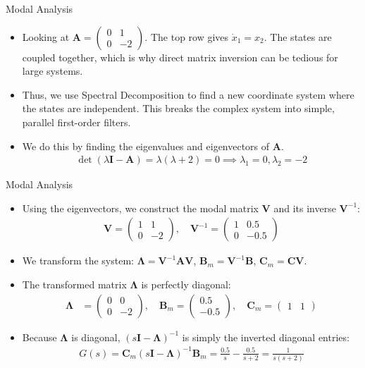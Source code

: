 \documentclass{beamer}
\theoremstyle{remark}
\newcommand{\myvec}[1]{\ensuremath{\begin{pmatrix}#1\end{pmatrix}}}
\let\vec\mathbf
\numberwithin{equation}{section}
\begin{document}
\begin{frame}{Modal Analysis}
    \begin{itemize}
        \item Looking at $\vec{A} = \myvec{0 & 1 \\ 0 & -2}$. The top row gives $\dot{x}_1 = x_2$. The states are coupled together, which is why direct matrix inversion can be tedious for large systems.
        \item Thus, we use Spectral Decomposition to find a new coordinate system where the states are independent. This breaks the complex system into simple, parallel first-order filters.
        \item We do this by finding the eigenvalues and eigenvectors of $\vec{A}$.
        \begin{align}
            \det(\lambda\vec{I} - \vec{A}) = \lambda(\lambda + 2) = 0 \implies \lambda_1 = 0, \lambda_2 = -2
        \end{align}
    \end{itemize}
\end{frame}

\begin{frame}{Modal Analysis}
    \begin{itemize}
        \item Using the eigenvectors, we construct the modal matrix $\vec{V}$ and its inverse $\vec{V}^{-1}$:
        \begin{align}
            \vec{V} = \myvec{ 1 & 1 \\ 0 & -2 }, \quad \vec{V}^{-1} = \myvec{ 1 & 0.5 \\ 0 & -0.5 }
        \end{align}
        \item We transform the system: $\vec{\Lambda} = \vec{V}^{-1}\vec{A}\vec{V}$, $\vec{B}_m = \vec{V}^{-1}\vec{B}$, $\vec{C}_m = \vec{C}\vec{V}$.
        \item The transformed matrix $\vec{\Lambda}$ is perfectly diagonal:
        \begin{align}
            \vec{\Lambda} &= \myvec{ 0 & 0 \\ 0 & -2 }, \quad \vec{B}_m = \myvec{ 0.5 \\ -0.5 }, \quad \vec{C}_m = \myvec{ 1 & 1 }
        \end{align}
        \item Because $\vec{\Lambda}$ is diagonal, $(s\vec{I} - \vec{\Lambda})^{-1}$ is simply the inverted diagonal entries:
        \begin{align}
            G(s) = \vec{C}_m(s\vec{I} - \vec{\Lambda})^{-1}\vec{B}_m = \frac{0.5}{s} - \frac{0.5}{s+2} = \frac{1}{s(s+2)}
        \end{align}
    \end{itemize}
\end{frame}
\end{document}
